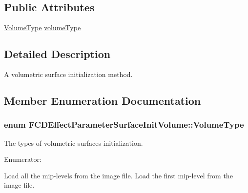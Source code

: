 \subsection*{Public Attributes}
\begin{DoxyCompactItemize}
\item 
\hyperlink{classFCDEffectParameterSurfaceInitVolume_a26c9418850b0c0d5a6c685b4ce4d890b}{VolumeType} \hyperlink{classFCDEffectParameterSurfaceInitVolume_aad5bb8a564f3583dce34eb2b916d87e7}{volumeType}
\end{DoxyCompactItemize}


\subsection{Detailed Description}
A volumetric surface initialization method. 

\subsection{Member Enumeration Documentation}
\hypertarget{classFCDEffectParameterSurfaceInitVolume_a26c9418850b0c0d5a6c685b4ce4d890b}{
\subsubsection[{VolumeType}]{\setlength{\rightskip}{0pt plus 5cm}enum {\bf FCDEffectParameterSurfaceInitVolume::VolumeType}}}
\label{classFCDEffectParameterSurfaceInitVolume_a26c9418850b0c0d5a6c685b4ce4d890b}
The types of volumetric surfaces initialization. \begin{Desc}
\item[Enumerator: ]\par
\begin{description}
\item[{\em 
\hypertarget{classFCDEffectParameterSurfaceInitVolume_a26c9418850b0c0d5a6c685b4ce4d890ba13ca69673f7e1aa87c61d5ef49df4512}{
PRIMARY}
\label{classFCDEffectParameterSurfaceInitVolume_a26c9418850b0c0d5a6c685b4ce4d890ba13ca69673f7e1aa87c61d5ef49df4512}
}]Load all the mip-\/levels from the image file. Load the first mip-\/level from the image file. \end{description}
\end{Desc}



